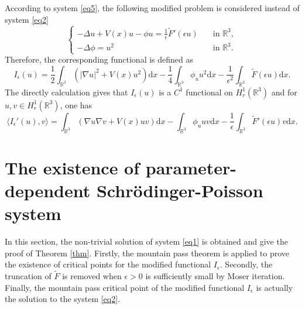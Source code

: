 \documentclass[12pt]{amsart}
\numberwithin{equation}{section}
\theoremstyle{definition}
\begin{document}
According to system \eqref{eq5}, the following modified problem is considered instead of system \eqref{eq2}
\begin{equation}\label{eq7}
	\begin{cases}
		-\Delta u+V(x) u-\phi u=\frac{1}{\epsilon}\tilde F'(\epsilon u) &\quad\text{in }\mathbb R^3,\\
		-\Delta\phi= u^2 &\quad\text{in }\mathbb R^3.
	\end{cases}
\end{equation}
Therefore, the corresponding functional is defined as
\begin{equation}\label{I_epsilon_1}
	\text{$I_{\epsilon}(u)$}=\frac{1}{2}\int_{\mathbb R^3}\left(|\nabla u|^2+V(x)u^2\right)\text{d}x-\frac{1}{4}\int_{\mathbb R^3}\phi_{u} u^2\text{d}x-\frac{1}{\epsilon^2}\int_{\mathbb R^3}\tilde F(\epsilon u)\text{d}x.
\end{equation}
The directly calculation gives that $I_{\epsilon}(u)$ is a $C^1$ functional on $H^{1}_{r}(\mathbb{R}^3)$ and for $u,v\in H^1_r(\mathbb R^3)$, one has
\begin{equation*}
\langle I_{\epsilon}'(u),v\rangle=\int_{\mathbb R^3}\left(\nabla u\nabla v+V(x)uv\right)\text{d}x-\int_{\mathbb R^3}\phi_uuv\text{d}x-\frac{1}{\epsilon}\int_{\mathbb R^3}\tilde F'(\epsilon u)v\text{d}x.
\end{equation*}
\section{The existence of parameter-dependent Schr\"{o}dinger-Poisson system }

In this section, the non-trivial solution of system \eqref{eq1} is obtained and give the proof of Theorem \ref{thm}. Firstly, the mountain pass theorem is applied to prove the existence of critical points for the modified functional $I_{\epsilon}$. Secondly, the truncation of $\tilde F$ is removed when $\epsilon>0$ is sufficiently small by Moser iteration. Finally,
the mountain pass critical point of the modified functional $I_{\epsilon}$ is actually the solution to the system \eqref{eq2}.
\end{document}
